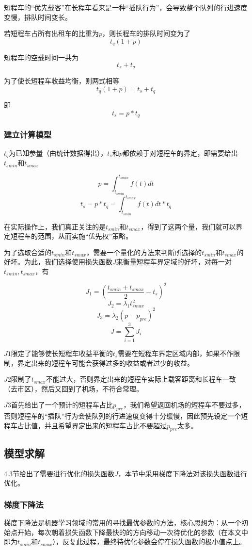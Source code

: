 \documentclass[UTF8]{ctexart}
\begin{document}
	短程车的“优先载客”在长程车看来是一种“插队行为”，会导致整个队列的行进速度变慢，排队时间变长。
	
	若短程车占所有出租车的比重为$p$，则长程车的排队时间变为了$$t_q(1 + p) $$
	
	短程车的空载时间一共为$$t_s + t_q $$
	
	为了使长短程车收益均衡，则两式相等$$t_q(1 + p) = t_s + t_q$$
	
	即$$t_s = p*t_q$$
	
	\subsubsection{建立计算模型}
	$t_q$为已知参量（由统计数据得出），$t_s$和$p$都依赖于对短程车的界定，即需要给出$t_{smin}$和$t_{smax}$
	
	$$p = \int_{t_{smin}}^{t_{smax}}f(t)dt$$
	$$t_s = p*t_q = \int_{t_{smin}}^{t_{smax}}f(t)dt*t_q$$
	
	在实际操作上，我们真正关注的是$t_{smin}$和$t_{smax}$，得到了这两个量，我们就可以界定短程车的范围，从而实施“优先权”策略。
	
	为了选取合适的$t_{smin}$和$t_{smax}$，需要一个量化的方法来判断所选择的$t_{smin}$和$t_{smax}$的好坏。为此，我们选择使用损失函数$J$来衡量短程车界定域的好坏，对每一对{$t_{smin},t_{smax}$}，有
	
	$$J_1 = (\frac{t_{smin}+t_{smax}}{2} - t_s)^2$$
	$$J_2 = \lambda_1 t_{smax}^2$$
	$$J_3 = \lambda_2 (p - p_{pre})^2$$
	$$J = \sum_{i=1}^{3}J_i$$
	
	$J1$限定了能够使长短程车收益平衡的$t_s$需要在短程车界定区域内部，如果不作限制，界定出来的短程车可能会获得过多的收益或者过少的收益。
	
	$J2$限制了$t_{smax}$不能过大，否则界定出来的短程车实际上载客距离和长程车一致（去市区），然后又回到了机场，不符合常理。
	
	$J3$首先给出了一个预计的短程车占比$p_{pre}$，我们希望返回机场的短程车不要过多，否则短程车的“插队”行为会使队列的行进速度变得十分缓慢，因此预先设定一个短程车占比值，并且希望界定出来的短程车占比不要超过$p_{pre}$太多。 
	
	
	\subsection{模型求解}
	4.3节给出了需要进行优化的损失函数$J$，本节中采用梯度下降法对该损失函数进行优化。
	
	\subsubsection{梯度下降法}
	梯度下降法是机器学习领域的常用的寻找最优参数的方法，核心思想为：从一个初始点开始，每次朝着损失函数下降最快的的方向移动一次待优化的参数（在本文中即为$t_{smin}$和$t_{smax}$），反复此过程，最终待优化参数会停在损失函数的极小值点上。
	
\end{document}
